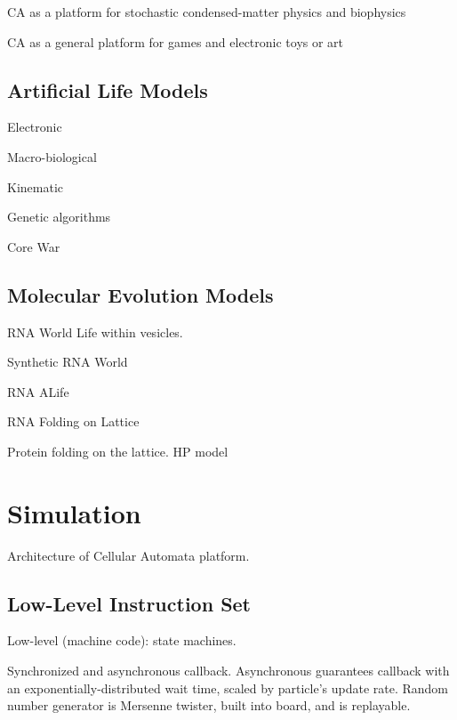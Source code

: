 \documentclass{acm_proc_article-sp}
\begin{document}
CA as a platform for stochastic condensed-matter physics and biophysics
\cite{Schiff2007}

CA as a general platform for games
\cite{SimCity,DwarfFortress,Minecraft}
and electronic toys or art \cite{RuckerCAPOW,PowderToy}

\subsection{Artificial Life Models}

Electronic
\cite{VonNeumannBook,Wireworld}

Macro-biological
\cite{ConwaysLife,Langton1986}

Kinematic
\cite{Stevens2011}

Genetic algorithms
\cite{Tierra,Avida}

Core War
\cite{CoreWarGuidelines84,CoreWarDewdney85,BarkleyWaitSchmidtCoreWar2004}

\subsection{Molecular Evolution Models}

RNA World
\cite{Woese1967}
Life within vesicles.  %

Synthetic RNA World
\cite{PaulJoyce2002}

RNA ALife
\cite{journals/alife/Schuster94}

RNA Folding on Lattice
\cite{LeoniVanderzande2003,JostEveraers2010,ZaraPretti2007,GillespieMayneJiang2009}

Protein folding on the lattice. HP model \cite{Dill1985,PandeRokhsar1999}

\section{Simulation}

Architecture of Cellular Automata platform.

\subsection{Low-Level Instruction Set}

Low-level (machine code):
state machines.

Synchronized and asynchronous callback.
Asynchronous guarantees callback with an exponentially-distributed wait time, scaled by particle's update rate.
Random number generator is Mersenne twister, built into board, and is replayable.
\end{document}
